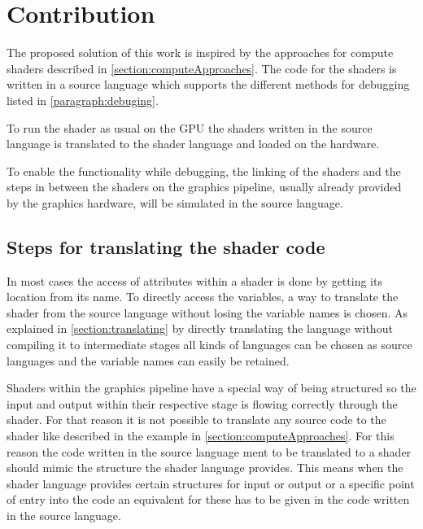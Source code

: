 

\chapter{Contribution}\label{cha:Contribution}

The proposed solution of this work is inspired by the approaches for compute shaders described in \autoref{section:computeApproaches}. The code for the shaders is written in a source language which supports the different methods for debugging listed in \autoref{paragraph:debuging}.

To run the shader as usual on the GPU the shaders written in the source language is translated to the shader language and loaded on the hardware.

To enable the functionality while debugging, the linking of the shaders and the steps in between the shaders on the graphics pipeline, usually already provided by the graphics hardware, will be simulated in the source language.

\section{Steps for translating the shader code}
\label{section:contribution_translating}

In most cases the access of attributes within a shader is done by getting its location from its name. To directly access the variables, a way to translate the shader from the source language without losing the variable names is chosen. As explained in \autoref{section:translating} by directly translating the language without compiling it to intermediate stages all kinds of languages can be chosen as source languages and the variable names can easily be retained.

Shaders within the graphics pipeline have a special way of being structured so the input and output within their respective stage is flowing correctly through the shader. For that reason it is not possible to translate any source code to the shader like described in the example in  \autoref{section:computeApproaches}. For this reason the code written in the source language ment to be translated to a shader should mimic the structure the shader language provides. This means when the shader language provides certain structures for input or output or a specific point of entry into the code an equivalent for these has to be given in the code written in the source language.

